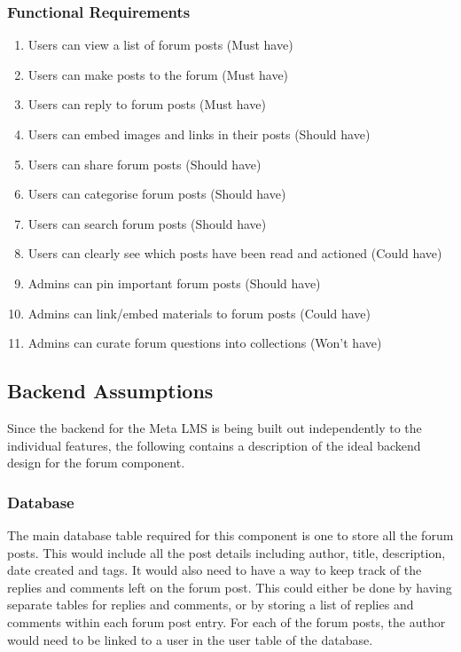 \subsubsection{Functional Requirements}
\begin{enumerate}
    \item Users can view a list of forum posts (Must have)
    \item Users can make posts to the forum (Must have)
    \item Users can reply to forum posts (Must have)
    \item Users can embed images and links in their posts (Should have)
    \item Users can share forum posts (Should have)
    \item Users can categorise forum posts (Should have)
    \item Users can search forum posts (Should have)
    \item Users can clearly see which posts have been read and actioned (Could have)
    \item Admins can pin important forum posts (Should have)
    \item Admins can link/embed materials to forum posts (Could have)
    \item Admins can curate forum questions into collections (Won't have)
\end{enumerate}

\subsection{Backend Assumptions}
Since the backend for the Meta LMS is being built out independently to the individual features, the following contains a description of the ideal backend design for the forum component.

\subsubsection{Database}
The main database table required for this component is one to store all the forum posts.
This would include all the post details including author, title, description, date created and tags.
It would also need to have a way to keep track of the replies and comments left on the forum post.
This could either be done by having separate tables for replies and comments, or by storing a list of replies and comments within each forum post entry.
For each of the forum posts, the author would need to be linked to a user in the user table of the database.

